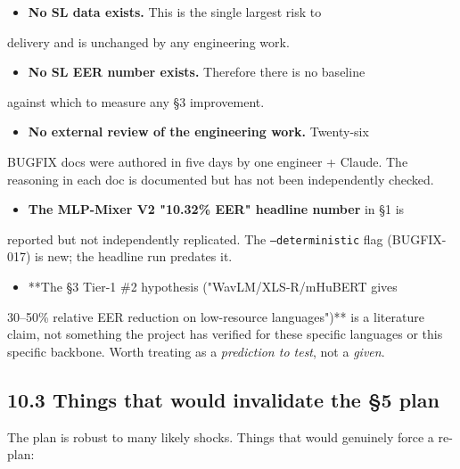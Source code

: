 \documentclass[10pt,a4paper]{article}
\begin{document}
\begin{itemize}[leftmargin=*,itemsep=2pt]
  \item \textbf{No SL data exists.} This is the single largest risk to
\end{itemize}
delivery and is unchanged by any engineering work.
\begin{itemize}[leftmargin=*,itemsep=2pt]
  \item \textbf{No SL EER number exists.} Therefore there is no baseline
\end{itemize}
against which to measure any §3 improvement.
\begin{itemize}[leftmargin=*,itemsep=2pt]
  \item \textbf{No external review of the engineering work.} Twenty-six
\end{itemize}
BUGFIX docs were authored in five days by one engineer + Claude. The reasoning in each doc is documented but has not been independently checked.
\begin{itemize}[leftmargin=*,itemsep=2pt]
  \item \textbf{The MLP-Mixer V2 "10.32\% EER" headline number} in §1 is
\end{itemize}
reported but not independently replicated. The \texttt{--deterministic} flag (BUGFIX-017) is new; the headline run predates it.
\begin{itemize}[leftmargin=*,itemsep=2pt]
  \item **The §3 Tier-1 \#2 hypothesis ("WavLM/XLS-R/mHuBERT gives
\end{itemize}
30--50\% relative EER reduction on low-resource languages")** is a literature claim, not something the project has verified for these specific languages or this specific backbone. Worth treating as a \textit{prediction to test}, not a \textit{given}.

\subsection*{10.3 Things that would invalidate the §5 plan}

The plan is robust to many likely shocks. Things that would genuinely force a re-plan:
\end{document}
